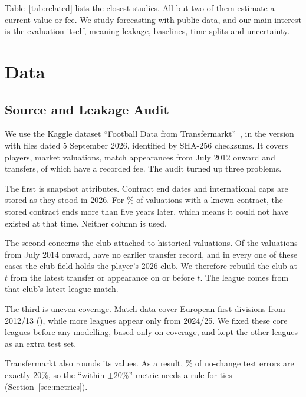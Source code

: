 \documentclass[conference]{IEEEtran}
\begin{document}
Table~\ref{tab:related} lists the closest studies. All but two of them estimate a current value or fee. We study forecasting with public data, and our main interest is the evaluation itself, meaning leakage, baselines, time splits and uncertainty.

\section{Data}

\subsection{Source and Leakage Audit}\label{sec:audit}
We use the Kaggle dataset ``Football Data from Transfermarkt''~\cite{kaggle_transfermarkt}, in the version with files dated 5 September 2026, identified by SHA-256 checksums. It covers \NRawPlayers{} players, \NRawValuations{} market valuations, \NRawAppearances{} match appearances from July 2012 onward and \NRawTransfers{} transfers, of which \NTransfersFee{} have a recorded fee. The audit turned up three problems.

The first is snapshot attributes. Contract end dates and international caps are stored as they stood in 2026. For \PctContractFuture\% of valuations with a known contract, the stored contract ends more than five years later, which means it could not have existed at that time. Neither column is used.

The second concerns the club attached to historical valuations. Of the \NValRowsLeakPeriod{} valuations from July 2014 onward, \NValRowsNoTransfer{} have no earlier transfer record, and in every one of these cases the club field holds the player's 2026 club. We therefore rebuild the club at $t$ from the latest transfer or appearance on or before $t$. The league comes from that club's latest league match.

The third is uneven coverage. Match data cover \NCoreLeagues{} European first divisions from 2012/13 (\CoreLeagueList), while \NNewLeagues{} more leagues appear only from 2024/25. We fixed these \NCoreLeagues{} core leagues before any modelling, based only on coverage, and kept the other leagues as an extra test set.

Transfermarkt also rounds its values. As a result, \PctTies\% of no-change test errors are exactly 20\%, so the ``within $\pm$20\%'' metric needs a rule for ties (Section~\ref{sec:metrics}).
\end{document}
